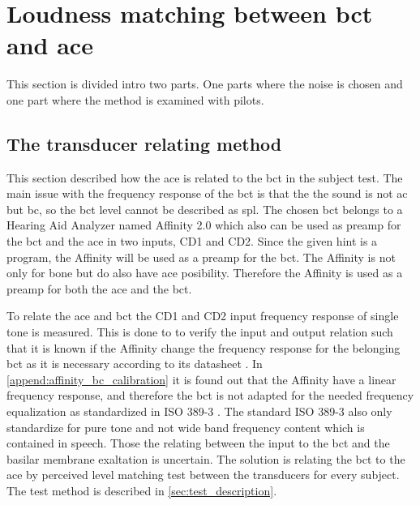 
\section{Loudness matching between \gls{bct} and \gls{ace}}
\label{sec:loudness_match}
This section is divided intro two parts. One parts where the noise is chosen and one part where the method is examined with pilots.


\subsection{The transducer relating method}

This section described how the \gls{ace} is related to the \gls{bct} in the subject test. The main issue with the frequency response of the \gls{bct} is that the the sound is not \gls{ac} but \gls{bc}, so the \gls{bct} level cannot be described as \gls{spl}. The chosen \gls{bct} belongs to a Hearing Aid Analyzer named Affinity 2.0 \citep{affinity_20} which also can be used as preamp for the \gls{bct} and the \gls{ace} in two inputs, CD1 and CD2. Since the given \gls{hint} is a \matlab program, the Affinity will be used as a preamp for the \gls{bct}. The Affinity is not only for bone but do also have  \gls{ace} posibility. Therefore the Affinity is used as a preamp for both the \gls{ace} and the \gls{bct}. 


To relate the \gls{ace} and \gls{bct} the CD1 and CD2 input frequency response of single tone is measured. This is done to to verify the input and output relation such that it is known if the Affinity change the frequency response for the belonging \gls{bct} as it is necessary according to its datasheet \citep{radioear_b81}. In  \autoref{append:affinity_bc_calibration} it is found out that the Affinity have a linear frequency response, and therefore the \gls{bct} is not adapted for the needed frequency equalization as standardized in ISO 389-3 \citep{iso_389-3}. The standard ISO 389-3 \citep{iso_389-3} also only standardize for pure tone and not wide band frequency content which is contained in speech. Those the relating between the input to the \gls{bct} and the basilar membrane exaltation is uncertain. The solution is relating the \gls{bct} to the \gls{ace} by perceived level matching test between the transducers for every subject. The test method is described in \autoref{sec:test_description}.


